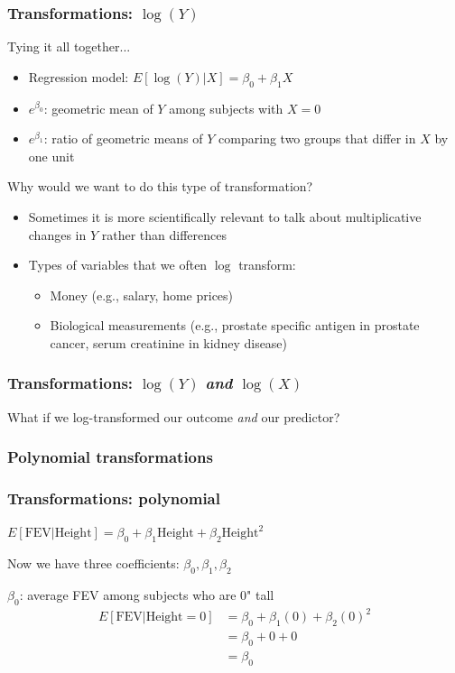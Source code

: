 \documentclass[12pt, 
hyperref={colorlinks=true, linkcolor=blue, urlcolor=cyan}]{beamer}
\begin{document}
\begin{frame}
\frametitle{Transformations: $\log(Y)$}
Tying it all together...
\begin{itemize}
\item \color{blue} Regression model: \color{black} $E[\log(Y)|X] = \beta_0 + \beta_1X$
\item \color{blue} $e^{\beta_0}$: \color{black} geometric mean of $Y$ among subjects with $X = 0$
\item \color{blue} $e^{\beta_1}$: \color{black} ratio of geometric means of $Y$ comparing two groups that differ in $X$ by one unit
\end{itemize}\pause

Why would we want to do this type of transformation?\vspace{-0.3cm}
\begin{itemize}
\item Sometimes it is more scientifically relevant to talk about multiplicative changes in $Y$ rather than differences
\item Types of variables that we often $\log$ transform:
	\begin{itemize}
	\item Money (e.g., salary, home prices)
	\item Biological measurements (e.g., prostate specific antigen in prostate cancer, serum creatinine in kidney disease)
	\end{itemize}
\end{itemize}
\end{frame}

\begin{frame}
\frametitle{Transformations: $\log(Y)$ \textit{and} $\log(X)$}
\center What if we log-transformed our outcome \textit{and} our predictor? %
\end{frame}

\subsubsection{Polynomial transformations}
\begin{frame}
\frametitle{Transformations: polynomial}
\begin{center} $E[\text{FEV}| \text{Height}] = \beta_0 + \beta_1 \text{Height} + \beta_2 \text{Height}^2$ \end{center}

Now we have three coefficients: $\beta_0, \beta_1, \beta_2$\pause

\color{blue} $\beta_0$: average FEV among subjects who are 0" tall \color{black} \pause
\begin{align*}
E[\text{FEV}|\text{Height} = 0] & = \beta_0 + \beta_1 (0) + \beta_2(0)^2 \\
& = \beta_0 + 0 + 0 \\
& = \beta_0
\end{align*}
\end{frame}
\end{document}
